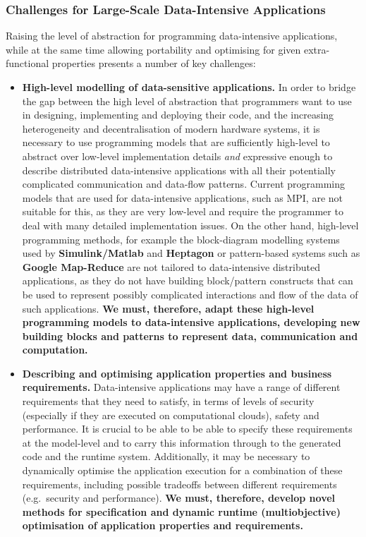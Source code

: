\documentclass[a4paper,11pt]{article}
\begin{document}
\vspace{-6pt}
\subsubsection{Challenges for Large-Scale Data-Intensive Applications}

Raising the level of abstraction for programming data-intensive applications, while at the same time allowing portability and optimising for given extra-functional properties presents a number of key challenges:

\begin{itemize}
\item \textbf{High-level modelling of data-sensitive applications.} In
  order to bridge the gap between the high level of abstraction that
  programmers want to use in designing, implementing and deploying their
  code, and the increasing heterogeneity and decentralisation of modern
  hardware systems, it is necessary to use programming models that are
  sufficiently high-level to abstract over low-level implementation details
  \emph{and} expressive enough to describe distributed
  data-intensive applications with all their potentially complicated
  communication and data-flow patterns. Current programming models that are used for data-intensive applications, such
  as MPI, are not suitable for this, as they are very low-level and
  require the programmer to deal with many detailed implementation
  issues. On the other hand, high-level programming methods, for
  example the block-diagram modelling systems used by
  \textbf{Simulink/Matlab} and \textbf{Heptagon} or pattern-based systems such as \textbf{Google Map-Reduce} are not tailored to
  data-intensive distributed applications, as they do not have building
  block/pattern constructs that can be used to represent possibly complicated
  interactions and flow of the data of such applications. \textbf{We
    must, therefore, adapt these high-level programming models to
    data-intensive applications, developing new building blocks and patterns to
    represent data, communication and computation.}

\item \textbf{Describing and optimising application properties and
  business requirements.} Data-intensive applications may have a range of
  different requirements that they need to satisfy, in terms of levels of
  security (especially if they are executed on computational clouds), safety
  and performance. It is crucial to be able to be able to specify these
  requirements at the model-level and to carry this information through to
  the generated code and the runtime system. %
  Additionally, it may be necessary to dynamically
  optimise the application execution for a combination of these
  requirements, including possible tradeoffs between different
  requirements (e.g.~security and performance). \textbf{We must,
    therefore, develop novel methods for specification and dynamic
    runtime (multiobjective) optimisation of application properties and
    requirements.}


\end{itemize}
\end{document}

